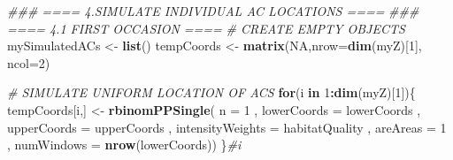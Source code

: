 \documentclass[
]{article}
\newenvironment{Shaded}{\begin{snugshade}}{\end{snugshade}}
\newcommand{\CommentTok}[1]{\textcolor[rgb]{0.56,0.35,0.01}{\textit{#1}}}
\newcommand{\ControlFlowTok}[1]{\textcolor[rgb]{0.13,0.29,0.53}{\textbf{#1}}}
\newcommand{\DataTypeTok}[1]{\textcolor[rgb]{0.13,0.29,0.53}{#1}}
\newcommand{\DecValTok}[1]{\textcolor[rgb]{0.00,0.00,0.81}{#1}}
\newcommand{\KeywordTok}[1]{\textcolor[rgb]{0.13,0.29,0.53}{\textbf{#1}}}
\newcommand{\NormalTok}[1]{#1}
\newcommand{\OperatorTok}[1]{\textcolor[rgb]{0.81,0.36,0.00}{\textbf{#1}}}
\newcommand{\OtherTok}[1]{\textcolor[rgb]{0.56,0.35,0.01}{#1}}
\newcommand{\StringTok}[1]{\textcolor[rgb]{0.31,0.60,0.02}{#1}}
\begin{document}
\begin{Shaded}
\begin{Highlighting}[]
\CommentTok{### ==== 4.SIMULATE INDIVIDUAL AC LOCATIONS ====}
\CommentTok{### ====  4.1 FIRST OCCASION ====}
\CommentTok{# CREATE EMPTY OBJECTS }
\NormalTok{mySimulatedACs <-}\StringTok{ }\KeywordTok{list}\NormalTok{()}
\NormalTok{tempCoords <-}\StringTok{ }\KeywordTok{matrix}\NormalTok{(}\OtherTok{NA}\NormalTok{,}\DataTypeTok{nrow=}\KeywordTok{dim}\NormalTok{(myZ)[}\DecValTok{1}\NormalTok{], }\DataTypeTok{ncol=}\DecValTok{2}\NormalTok{)}

\CommentTok{# SIMULATE UNIFORM LOCATION OF ACS}
\ControlFlowTok{for}\NormalTok{(i }\ControlFlowTok{in} \DecValTok{1}\OperatorTok{:}\KeywordTok{dim}\NormalTok{(myZ)[}\DecValTok{1}\NormalTok{])\{}
\NormalTok{   tempCoords[i,] <-}\StringTok{ }\KeywordTok{rbinomPPSingle}\NormalTok{( }\DataTypeTok{n =} \DecValTok{1}
\NormalTok{                                     , }\DataTypeTok{lowerCoords =}\NormalTok{ lowerCoords}
\NormalTok{                                     , }\DataTypeTok{upperCoords =}\NormalTok{ upperCoords}
\NormalTok{                                     , }\DataTypeTok{intensityWeights =}\NormalTok{ habitatQuality}
\NormalTok{                                     , }\DataTypeTok{areAreas =} \DecValTok{1}
\NormalTok{                                     , }\DataTypeTok{numWindows =} \KeywordTok{nrow}\NormalTok{(lowerCoords))}
\NormalTok{\}}\CommentTok{#i}


\end{Highlighting}
\end{Shaded}
\end{document}

